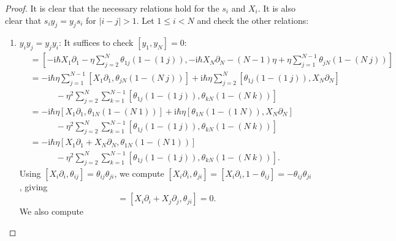 \documentclass[11pt]{report}
\theoremstyle{definition}
\theoremstyle{remark}
\theoremstyle{remark}
\newcommand{\I}{\mathrm{i}}
\begin{document}
\begin{proof}
It is clear that the necessary relations hold for the $s_i$ and $X_i$. It is also clear that $s_i y_j = y_j s_i$ for $|i-j|>1$. Let $1 \leq i < N$ and check the other relations:
\begin{enumerate}[label=(\roman*)]
\item $y_i y_j = y_j y_i$: It suffices to check $[y_1,y_N] = 0$:
\begin{align*}
[y_1,y_N] &= \left[ -\I \hbar X_1 \partial_1 - \eta \sum_{j=2}^N \theta_{1j} (1-(1 \ j)), -\I \hbar X_N \partial_N - (N-1) \eta + \eta \sum_{j=1}^{N-1} \theta_{jN} (1-(N \ j)) \right] \\
&= -\I\hbar\eta \sum_{j=1}^{N-1} \left[ X_1 \partial_1,\theta_{jN} (1-(N \ j)) \right] 
+ \I \hbar \eta \sum_{j=2}^N \left[ \theta_{1j} (1-(1 \ j)), X_N \partial_N \right] \\
&\quad \quad \quad-\eta^2 \sum_{j=2}^N \sum_{k=1}^{N-1} \left[ \theta_{1j} (1-(1 \ j)), \theta_{kN} (1-(N \ k)) \right] \\
&= -\I\hbar\eta \left[ X_1 \partial_1,\theta_{1N} (1-(N \ 1)) \right] 
+ \I \hbar \eta \left[ \theta_{1N} (1-(1 \ N)), X_N \partial_N \right] \\
&\quad \quad \quad-\eta^2 \sum_{j=2}^N \sum_{k=1}^{N-1} \left[ \theta_{1j} (1-(1 \ j)), \theta_{kN} (1-(N \ k)) \right] \\
&= -\I\hbar\eta \left[ X_1 \partial_1 + X_N \partial_N,\theta_{1N} (1-(N \ 1)) \right] \\
&\quad \quad \quad-\eta^2 \sum_{j=2}^N \sum_{k=1}^{N-1} \left[ \theta_{1j} (1-(1 \ j)), \theta_{kN} (1-(N \ k)) \right].
\end{align*}
Using $[X_i \partial_i,\theta_{ij}] = \theta_{ij} \theta_{ji}$, we compute $
[X_i \partial_i,\theta_{ji}] = [X_i \partial_i,1-\theta_{ij}] = -\theta_{ij} \theta_{ji}$, giving
\begin{equation*}
[X_i \partial_i + X_j \partial_j,\theta_{ij}] = [X_i \partial_i + X_j \partial_j,\theta_{ji}] = 0.
\end{equation*}
We also compute

\end{enumerate}
\end{proof}
\end{document}
